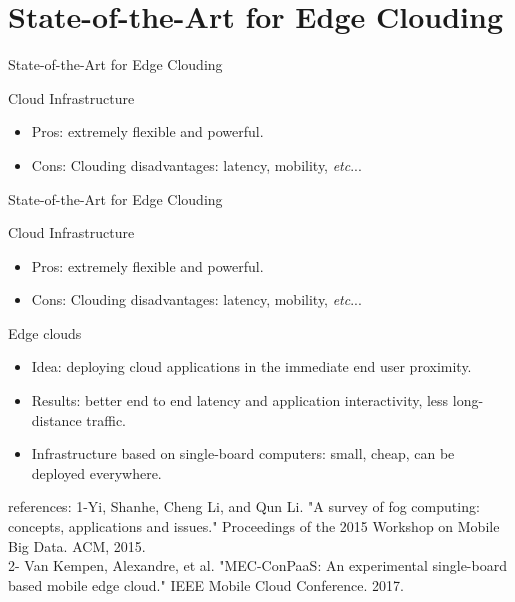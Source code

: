 \documentclass{beamer}
\begin{document}
\section{State-of-the-Art for Edge Clouding}

\begin{frame}{State-of-the-Art for Edge Clouding}

\begin{block}{Cloud Infrastructure}
    \begin{itemize}
    \item  Pros: extremely flexible and powerful.
    \item<2->  Cons: Clouding disadvantages: latency, mobility, {\em etc}...

    \end{itemize}
    \end{block}

\end{frame}

\begin{frame}{State-of-the-Art for Edge Clouding}

\begin{block}{Cloud Infrastructure}
    \begin{itemize}
    \item  Pros: extremely flexible and powerful.
    \item  Cons: Clouding disadvantages: latency, mobility, {\em etc}...

    \end{itemize}
    \end{block}

\begin{block}{Edge clouds}
    \begin{itemize}
    \item Idea: deploying cloud applications in the immediate end user proximity.
    \item<2-> Results: better end to end latency and application interactivity, less long-distance traffic.
     \item<3-> Infrastructure based on single-board computers: small, cheap, can  be deployed everywhere.
   
    \end{itemize}
    \end{block}
 {\tiny *references: 1-Yi, Shanhe, Cheng Li, and Qun Li. "A survey of fog computing: concepts, applications and issues." Proceedings of the 2015 Workshop on Mobile Big Data. ACM, 2015.\\
2- Van Kempen, Alexandre, et al. "MEC-ConPaaS: An experimental single-board based mobile edge cloud." IEEE Mobile Cloud Conference. 2017.}

\end{frame}
\end{document}
